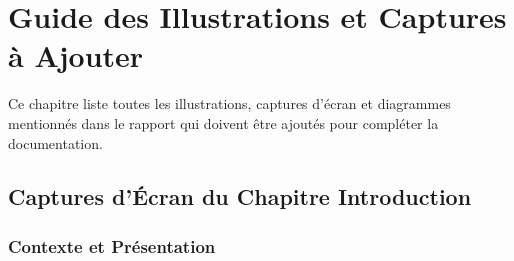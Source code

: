 
\chapter{Guide des Illustrations et Captures à Ajouter}

\begin{objectivebox}
Ce chapitre liste toutes les illustrations, captures d'écran et diagrammes mentionnés dans le rapport qui doivent être ajoutés pour compléter la documentation.
\end{objectivebox}

\section{Captures d'Écran du Chapitre Introduction}

\subsection{Contexte et Présentation}

